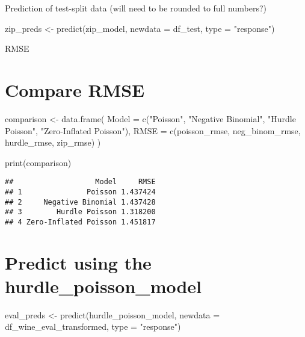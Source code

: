 \documentclass[
]{article}
\newenvironment{Shaded}{\begin{snugshade}}{\end{snugshade}}
\newcommand{\AttributeTok}[1]{\textcolor[rgb]{0.77,0.63,0.00}{#1}}
\newcommand{\DecValTok}[1]{\textcolor[rgb]{0.00,0.00,0.81}{#1}}
\newcommand{\FunctionTok}[1]{\textcolor[rgb]{0.00,0.00,0.00}{#1}}
\newcommand{\NormalTok}[1]{#1}
\newcommand{\OtherTok}[1]{\textcolor[rgb]{0.56,0.35,0.01}{#1}}
\newcommand{\SpecialCharTok}[1]{\textcolor[rgb]{0.00,0.00,0.00}{#1}}
\newcommand{\StringTok}[1]{\textcolor[rgb]{0.31,0.60,0.02}{#1}}
\begin{document}
Prediction of test-split data (will need to be rounded to full numbers?)

\begin{Shaded}
\begin{Highlighting}[]
\NormalTok{zip\_preds }\OtherTok{\textless{}{-}} \FunctionTok{predict}\NormalTok{(zip\_model, }\AttributeTok{newdata =}\NormalTok{ df\_test, }\AttributeTok{type =} \StringTok{"response"}\NormalTok{)}
\end{Highlighting}
\end{Shaded}

RMSE

\begin{Shaded}
\end{Shaded}

\hypertarget{compare-rmse}{%
\section{Compare RMSE}\label{compare-rmse}}

\begin{Shaded}
\begin{Highlighting}[]
\NormalTok{comparison }\OtherTok{\textless{}{-}} \FunctionTok{data.frame}\NormalTok{(}
  \AttributeTok{Model =} \FunctionTok{c}\NormalTok{(}\StringTok{"Poisson"}\NormalTok{, }\StringTok{"Negative Binomial"}\NormalTok{, }\StringTok{"Hurdle Poisson"}\NormalTok{, }\StringTok{"Zero{-}Inflated Poisson"}\NormalTok{),}
  \AttributeTok{RMSE =} \FunctionTok{c}\NormalTok{(poisson\_rmse, neg\_binom\_rmse, hurdle\_rmse, zip\_rmse)}
\NormalTok{)}

\FunctionTok{print}\NormalTok{(comparison)}
\end{Highlighting}
\end{Shaded}

\begin{verbatim}
##                   Model     RMSE
## 1               Poisson 1.437424
## 2     Negative Binomial 1.437428
## 3        Hurdle Poisson 1.318200
## 4 Zero-Inflated Poisson 1.451817
\end{verbatim}

\hypertarget{predict-using-the-hurdle_poisson_model}{%
\section{Predict using the
hurdle\_poisson\_model}\label{predict-using-the-hurdle_poisson_model}}

\begin{Shaded}
\begin{Highlighting}[]
\NormalTok{eval\_preds }\OtherTok{\textless{}{-}} \FunctionTok{predict}\NormalTok{(hurdle\_poisson\_model, }\AttributeTok{newdata =}\NormalTok{ df\_wine\_eval\_transformed, }\AttributeTok{type =} \StringTok{"response"}\NormalTok{)}
\end{Highlighting}
\end{Shaded}
\end{document}
